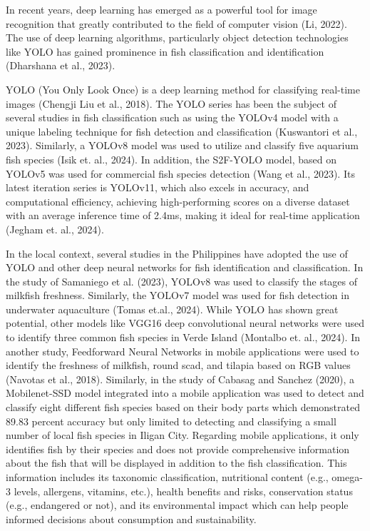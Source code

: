 In recent years, deep learning has emerged as a powerful tool for image recognition that greatly contributed to the field of computer vision (Li, 2022). The use of deep learning algorithms, particularly object detection technologies like YOLO has gained prominence in fish classification and identification (Dharshana et al., 2023). 

YOLO (You Only Look Once) is a deep learning method for classifying real-time images (Chengji Liu et al., 2018). The YOLO series has been the subject of several studies in fish classification such as using the YOLOv4 model with a unique labeling technique for fish detection and classification (Kuswantori et al., 2023). Similarly, a YOLOv8 model was used to utilize and classify five aquarium fish species (Isik et. al., 2024). In addition, the S2F-YOLO model, based on YOLOv5 was used for commercial fish species detection (Wang et al., 2023). Its latest iteration series is YOLOv11, which also excels in accuracy, and computational efficiency, achieving high-performing scores on a diverse dataset with an average inference time of 2.4ms, making it ideal for real-time application (Jegham et. al., 2024).

In the local context, several studies in the Philippines have adopted the use of YOLO and other deep neural networks for fish identification and classification. In the study of Samaniego et al. (2023), YOLOv8 was used to classify the stages of milkfish freshness. Similarly, the YOLOv7 model was used for fish detection in underwater aquaculture (Tomas et.al., 2024). While YOLO has shown great potential, other models like VGG16 deep convolutional neural networks were used to identify three common fish species in Verde Island (Montalbo et. al., 2024). In another study, Feedforward Neural Networks in mobile applications were used to identify the freshness of milkfish, round scad, and tilapia based on RGB values (Navotas et al., 2018). Similarly, in the study of Cabasag and Sanchez (2020), a Mobilenet-SSD model integrated into a mobile application was used to detect and classify eight different fish species based on their body parts which demonstrated 89.83 percent accuracy but only limited to detecting and classifying a small number of local fish species in Iligan City. Regarding mobile applications, it only identifies fish by their species and does not provide comprehensive information about the fish that will be displayed in addition to the fish classification. This information includes its taxonomic classification, nutritional content (e.g., omega-3 levels, allergens, vitamins, etc.), health benefits and risks, conservation status (e.g., endangered or not), and its environmental impact which can help people informed decisions about consumption and sustainability.

